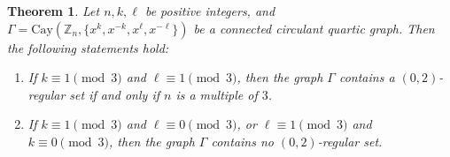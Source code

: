 \documentclass[12pt]{article}
\newtheorem{thmA}[propA]{Theorem}
\begin{document}
 \begin{thmA}\label{thm:02}
	Let $n, k, \ell$ be positive integers, and $\Gamma = \mathrm{Cay}(\mathbb{Z}_n, \{x^k, x^{-k}, x^\ell, x^{-\ell}\})$ be a connected circulant quartic graph. Then the following statements hold:
	\begin{enumerate}
		\item[(i)]  If \(k \equiv 1 \pmod{3}\) and \(\ell \equiv 1 \pmod{3}\), then  the graph \(\Gamma\) contains a \((0,2)\)-regular set if and only if $n$ is a multiple of $3$.

		\item[(ii)] If \(k\equiv 1 \pmod{3}\) and \(\ell\equiv 0 \pmod{3}\), or \(\ell\equiv 1 \pmod{3}\) and \(k\equiv 0 \pmod{3}\), then the graph \(\Gamma\) contains no \((0,2)\)-regular set.
	\end{enumerate}
\end{thmA}
\end{document}
